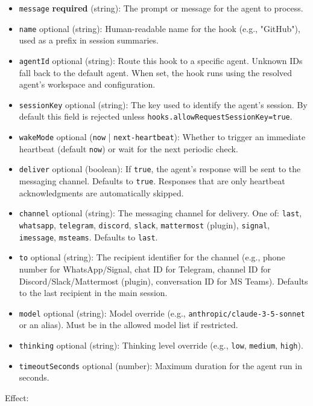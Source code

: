 \begin{itemize}
  \item \texttt{message} \textbf{required} (string): The prompt or message for the agent to process.
  \item \texttt{name} optional (string): Human-readable name for the hook (e.g., "GitHub"), used as a prefix in session summaries.
  \item \texttt{agentId} optional (string): Route this hook to a specific agent. Unknown IDs fall back to the default agent. When set, the hook runs using the resolved agent's workspace and configuration.
  \item \texttt{sessionKey} optional (string): The key used to identify the agent's session. By default this field is rejected unless \texttt{hooks.allowRequestSessionKey=true}.
  \item \texttt{wakeMode} optional (\texttt{now} | \texttt{next-heartbeat}): Whether to trigger an immediate heartbeat (default \texttt{now}) or wait for the next periodic check.
  \item \texttt{deliver} optional (boolean): If \texttt{true}, the agent's response will be sent to the messaging channel. Defaults to \texttt{true}. Responses that are only heartbeat acknowledgments are automatically skipped.
  \item \texttt{channel} optional (string): The messaging channel for delivery. One of: \texttt{last}, \texttt{whatsapp}, \texttt{telegram}, \texttt{discord}, \texttt{slack}, \texttt{mattermost} (plugin), \texttt{signal}, \texttt{imessage}, \texttt{msteams}. Defaults to \texttt{last}.
  \item \texttt{to} optional (string): The recipient identifier for the channel (e.g., phone number for WhatsApp/Signal, chat ID for Telegram, channel ID for Discord/Slack/Mattermost (plugin), conversation ID for MS Teams). Defaults to the last recipient in the main session.
  \item \texttt{model} optional (string): Model override (e.g., \texttt{anthropic/claude-3-5-sonnet} or an alias). Must be in the allowed model list if restricted.
  \item \texttt{thinking} optional (string): Thinking level override (e.g., \texttt{low}, \texttt{medium}, \texttt{high}).
  \item \texttt{timeoutSeconds} optional (number): Maximum duration for the agent run in seconds.
\end{itemize}


Effect:

